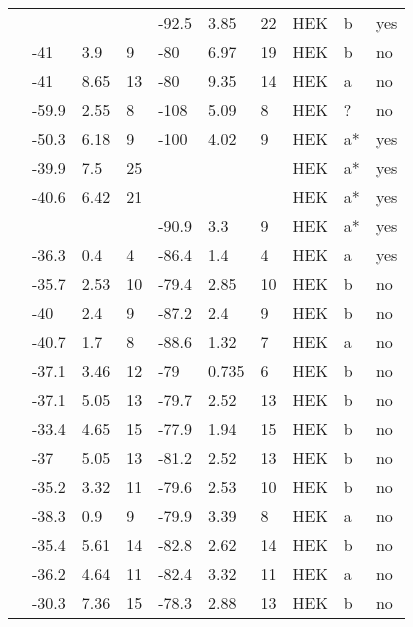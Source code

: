 \begin{longtable}{p{5cm}|lll|lll|lll}
\citet{Hu2014MutationDB} & && & -92.5 & 3.85 & 22 & HEK & b & yes \\
\citet{Hu2015MutationDB} & -41 & 3.9 & 9 & -80 & 6.97 & 19 & HEK & b & no \\
\citet{Hu2015MutationDB} & -41 & 8.65 & 13 & -80 & 9.35 & 14 & HEK & a & no \\
\citet{Huang2006MutationDB} & -59.9 & 2.55 & 8 & -108 & 5.09 & 8 & HEK & ? & no \\
\citet{Huang2009MutationDB} & -50.3 & 6.18 & 9 & -100 & 4.02 & 9 & HEK & a* & yes \\
\citet{Itoh2005aMutationDB} & -39.9 & 7.5 & 25 & && & HEK & a* & yes \\
\citet{Itoh2005bMutationDB} & -40.6 & 6.42 & 21 & && & HEK & a* & yes \\
\citet{Itoh2007MutationDB} & && & -90.9 & 3.3 & 9 & HEK & a* & yes \\
\citet{Juang2014aMutationDB} & -36.3 & 0.4 & 4 & -86.4 & 1.4 & 4 & HEK & a & yes \\
\citet{Kapplinger2015MutationDB} & -35.7 & 2.53 & 10 & -79.4 & 2.85 & 10 & HEK & b & no \\
\citet{Kapplinger2015MutationDB} & -40 & 2.4 & 9 & -87.2 & 2.4 & 9 & HEK & b & no \\
\citet{Kapplinger2015MutationDB} & -40.7 & 1.7 & 8 & -88.6 & 1.32 & 7 & HEK & a & no \\
\citet{Kapplinger2015MutationDB} & -37.1 & 3.46 & 12 & -79 & 0.735 & 6 & HEK & b & no \\
\citet{Kapplinger2015MutationDB} & -37.1 & 5.05 & 13 & -79.7 & 2.52 & 13 & HEK & b & no \\
\citet{Kapplinger2015MutationDB} & -33.4 & 4.65 & 15 & -77.9 & 1.94 & 15 & HEK & b & no \\
\citet{Kapplinger2015MutationDB} & -37 & 5.05 & 13 & -81.2 & 2.52 & 13 & HEK & b & no \\
\citet{Kapplinger2015MutationDB} & -35.2 & 3.32 & 11 & -79.6 & 2.53 & 10 & HEK & b & no \\
\citet{Kapplinger2015MutationDB} & -38.3 & 0.9 & 9 & -79.9 & 3.39 & 8 & HEK & a & no \\
\citet{Kapplinger2015MutationDB} & -35.4 & 5.61 & 14 & -82.8 & 2.62 & 14 & HEK & b & no \\
\citet{Kapplinger2015MutationDB} & -36.2 & 4.64 & 11 & -82.4 & 3.32 & 11 & HEK & a & no \\
\citet{Kapplinger2015MutationDB} & -30.3 & 7.36 & 15 & -78.3 & 2.88 & 13 & HEK & b & no \\

\end{longtable}
